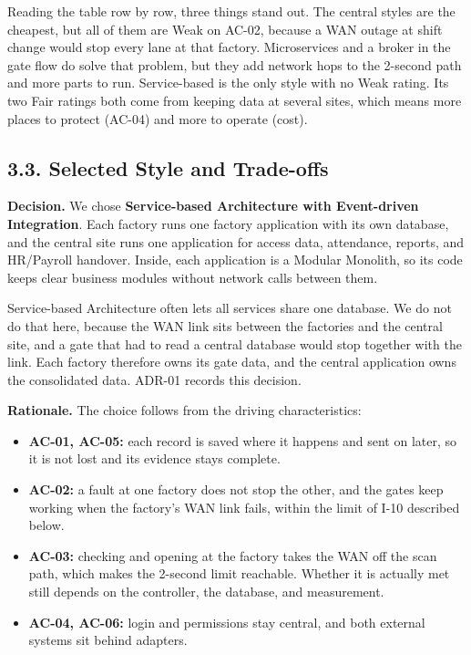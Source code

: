 \medskip
{}
Reading the table row by row, three things stand out. The central styles are the cheapest, but all of them are Weak on AC-02, because a WAN outage at shift change would stop every lane at that factory. Microservices and a broker in the gate flow do solve that problem, but they add network hops to the 2-second path and more parts to run. Service-based is the only style with no Weak rating. Its two Fair ratings both come from keeping data at several sites, which means more places to protect (AC-04) and more to operate (cost).

\subsection*{3.3. Selected Style and Trade-offs}

{}


\textbf{Decision.} We chose \textbf{Service-based Architecture with Event-driven Integration}. Each factory runs one factory application with its own database, and the central site runs one application for access data, attendance, reports, and HR/Payroll handover. Inside, each application is a Modular Monolith, so its code keeps clear business modules without network calls between them.

Service-based Architecture often lets all services share one database. We do not do that here, because the WAN link sits between the factories and the central site, and a gate that had to read a central database would stop together with the link. Each factory therefore owns its gate data, and the central application owns the consolidated data. ADR-01 records this decision.

\textbf{Rationale.} The choice follows from the driving characteristics:

\begin{itemize}[leftmargin=36pt, itemsep=2pt, topsep=4pt, parsep=2pt]
  \item \textbf{AC-01, AC-05:} each record is saved where it happens and sent on later, so it is not lost and its evidence stays complete.
  \item \textbf{AC-02:} a fault at one factory does not stop the other, and the gates keep working when the factory's WAN link fails, within the limit of I-10 described below.
  \item \textbf{AC-03:} checking and opening at the factory takes the WAN off the scan path, which makes the 2-second limit reachable. Whether it is actually met still depends on the controller, the database, and measurement.
  \item \textbf{AC-04, AC-06:} login and permissions stay central, and both external systems sit behind adapters.
\end{itemize}

